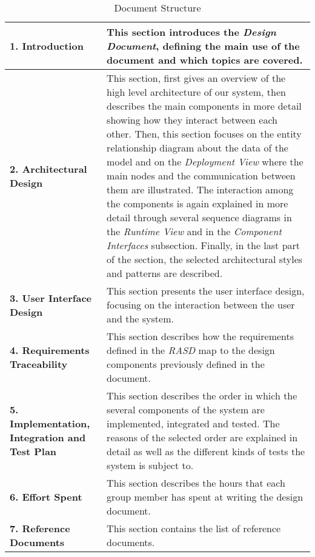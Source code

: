 \begin{center}
\centering
\begin{table}[H]
\centering
\begin{tabular} { p{4cm}  p{10 cm} }
\toprule
\textbf{1. Introduction} & This section introduces the \textit{Design Document}, defining the main use of the document and which topics are covered.                                                                                                                                  \\ \midrule
\textbf{2. Architectural Design} & This section, first gives an overview of the high level architecture of our system, then describes the main components in more detail showing how they interact between each other. Then, this section focuses on the entity relationship diagram about the data of the model and on the \textit{Deployment View} where the main nodes and the communication between them are illustrated. The interaction among the components is again explained in more detail through several sequence diagrams in the \textit{Runtime View} and in the \textit{Component Interfaces} subsection. Finally, in the last part of the section, the selected architectural styles and patterns are described. \\ \midrule
\textbf{3. User Interface Design} &  This section presents the user interface design, focusing on the interaction between the user and the system.  \\ \midrule
\textbf{4. Requirements Traceability}  & This section describes how the requirements defined in the \textit{RASD} map to the design components previously defined in the document.\\ \midrule
\textbf{5. Implementation, Integration and Test Plan} &  This section describes the order in which the several components of the system are implemented, integrated and tested. The reasons of the selected order are explained in detail as well as the different kinds of tests the system is subject to.
\\ \midrule
\textbf {6. Effort Spent} & This section describes the hours that each group member has spent at writing the design document. \\ \midrule
\textbf{7. Reference Documents} & This section contains the list of  reference documents. \\ \bottomrule
\end{tabular}
\caption{Document Structure}
\end{table}
\clearpage
\end{center}
\clearpage
